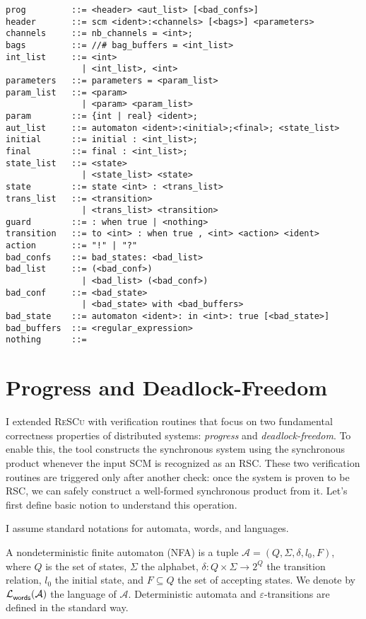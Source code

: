\begin{lstlisting}[language={},caption={Simplified SCM grammar},
    keywordstyle=\color{blue}\bfseries,label={lst:scm-grammar}] 
prog         ::= <header> <aut_list> [<bad_confs>]
header       ::= scm <ident>:<channels> [<bags>] <parameters>
channels     ::= nb_channels = <int>;
bags         ::= //# bag_buffers = <int_list>
int_list     ::= <int>
               | <int_list>, <int>
parameters   ::= parameters = <param_list>
param_list   ::= <param>
               | <param> <param_list>
param        ::= {int | real} <ident>;
aut_list     ::= automaton <ident>:<initial>;<final>; <state_list>
initial      ::= initial : <int_list>;
final        ::= final : <int_list>;
state_list   ::= <state>
               | <state_list> <state>
state        ::= state <int> : <trans_list>
trans_list   ::= <transition>
               | <trans_list> <transition>
guard        ::= : when true | <nothing>
transition   ::= to <int> : when true , <int> <action> <ident>
action       ::= "!" | "?"
bad_confs    ::= bad_states: <bad_list>
bad_list     ::= (<bad_conf>)
               | <bad_list> (<bad_conf>)
bad_conf     ::= <bad_state>
               | <bad_state> with <bad_buffers>
bad_state    ::= automaton <ident>: in <int>: true [<bad_state>]
bad_buffers  ::= <regular_expression>
nothing      ::= 
\end{lstlisting}

\section{Progress and Deadlock-Freedom}
I extended \textsc{ReSCu} with verification routines that focus on two
fundamental correctness properties of distributed systems: \emph{progress} and
\emph{deadlock-freedom}. To enable this, the tool constructs the synchronous
system using the synchronous product whenever the input SCM is recognized as an
RSC. These two verification routines are triggered only after another check: 
once the system is proven to be RSC, we can safely construct a well-formed 
synchronous product from it. Let's first define basic notion to understand this operation.

I assume standard notations for automata, words, and languages. 
\begin{definition}[NFA]
    A nondeterministic finite automaton (NFA) is a tuple 
    $\mathcal A = (Q, \Sigma, \delta, l_0, F)$, where $Q$ is the set of states, 
    $\Sigma$ the alphabet, $\delta : Q \times \Sigma \to 2^Q$ the transition relation, 
    $l_0$ the initial state, and $F \subseteq Q$ the set of accepting states. 
    We denote by $\mathcal{L}_{\mathsf{words}}^{}(\mathcal A)$ the language of $\mathcal A$. 
    Deterministic automata and $\varepsilon$-transitions are defined in the standard way.  
\end{definition}

